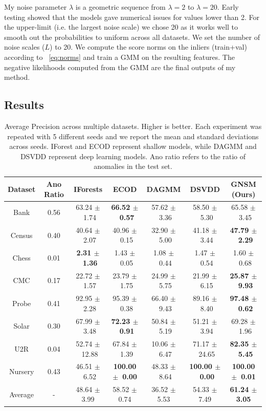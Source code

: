 My noise parameter $\lambda$ is a geometric sequence from $\lambda=2$ to $\lambda=20$. Early testing showed that the models gave numerical issues for values lower than 2. For the upper-limit (i.e. the largest noise scale) we chose 20 as it works well to smooth out the probabilities to uniform across all datasets. We set the number of noise scales ($L$) to 20. We compute the score norms on the inliers (train+val) according to ~\ref{eq:norms} and train a GMM on the resulting features. The negative likelihoods computed from the GMM are the final outputs of my method.

\subsection*{Results}

\begin{table}[!ht]
    \centering
    \small
    \hspace*{-0.8cm}\begin{tabular}{c|c|ccccc}
    Dataset & Ano Ratio & IForests       & ECOD           & DAGMM          & DSVDD          & GNSM (Ours) \\
    \midrule
    Bank   & 0.56 & 63.24 $\pm$~1.74 & \textbf{66.52 $\pm$~0.57} & 57.62 $\pm$~3.36 & 58.50 $\pm$~5.30 & 65.58 $\pm$~3.45 \\
    Census  & 0.40 & 40.64 $\pm$~2.07 & 40.96 $\pm$~0.15 & 32.90 $\pm$~5.00 & 41.18 $\pm$~3.44 & \textbf{47.79 $\pm$~2.29} \\
    Chess   & 0.01 & \textbf{2.31 $\pm$~1.36} & 1.43 $\pm$~0.05 & 1.08 $\pm$~0.44 & 1.47 $\pm$~0.54 & 1.60 $\pm$~0.68  \\
    CMC      & 0.17 & 22.72 $\pm$~1.57 & 23.79 $\pm$~1.75 & 24.99 $\pm$~5.75 & 21.99 $\pm$~6.15 & \textbf{25.87 $\pm$~9.93} \\
    Probe    & 0.41 & 92.95 $\pm$~2.28 & 95.39 $\pm$~0.38 & 66.40 $\pm$~9.43 & 89.16 $\pm$~8.40 & \textbf{97.48 $\pm$~0.62} \\
    Solar   & 0.30 & 67.99 $\pm$~3.48 & \textbf{72.23 $\pm$~0.91} & 50.84 $\pm$~5.19 & 51.21 $\pm$~3.94 & 69.28 $\pm$~1.96 \\
    U2R     & 0.04 & 52.74 $\pm$~12.88 & 67.84 $\pm$~1.39 & 10.06 $\pm$~6.47 & 71.17 $\pm$~24.65 & \textbf{82.35 $\pm$~5.45} \\
    Nursery & 0.43 & 46.51 $\pm$~6.52 & \textbf{100.00 $\pm$~0.00} & 48.33 $\pm$~8.64 & \textbf{100.00 $\pm$~0.00} & \textbf{100.00 $\pm$~0.01} \\
    \midrule
Average & - & 48.64 $\pm$ 3.99 & 58.52 $\pm$ 0.74 & 36.52 $\pm$ 5.53 & 54.33 $\pm$ 7.49 & \textbf{61.24 $\pm$ 3.05}
    \end{tabular}
    \caption{Average Precision across multiple datasets. Higher is better. Each experiment was repeated with 5 different seeds and we report the mean and standard deviations across seeds. IForest and ECOD represent shallow models, while DAGMM and DSVDD represent deep learning models. Ano ratio refers to the ratio of anomalies in the test set.}
    \label{tabular_results}
\end{table}

